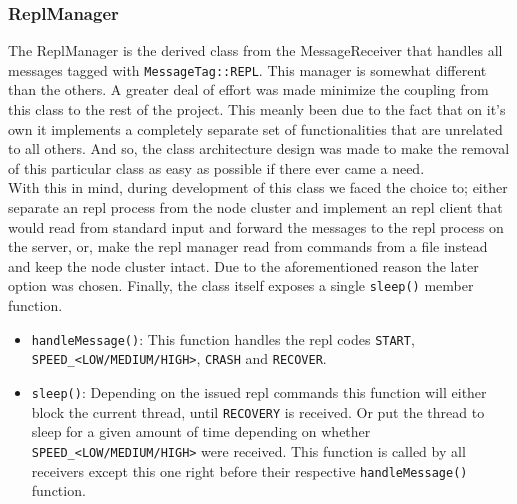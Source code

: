 \documentclass[11pt]{article}
\begin{document}
\subsubsection{ReplManager}
The ReplManager is the derived class from the MessageReceiver that handles all
messages tagged with \texttt{MessageTag::REPL}. This manager is somewhat
different than the others. A greater deal of effort was made minimize the
coupling from this class to the rest of the project. This meanly been due to the
fact that on it's own it implements a completely separate set of functionalities
that are unrelated to all others. And so, the class architecture design was made
to make the removal of this particular class as easy as possible if there ever
came a need.\\ With this in mind, during development of this class we faced the
choice to; either separate an repl process from the node cluster and implement
an repl client that would read from standard input and forward the messages to
the repl process on the server, or, make the repl manager read from commands
from a file instead and keep the node cluster intact. Due to the aforementioned
reason the later option was chosen. Finally, the class itself exposes a single
\texttt{sleep()} member function.\\
\begin{itemize}
\item \texttt{handleMessage()}: This function handles the repl codes
  \texttt{START}, \texttt{SPEED\_<LOW/MEDIUM/HIGH>}, \texttt{CRASH} and
  \texttt{RECOVER}.\\
\item \texttt{sleep()}: Depending on the issued repl commands this function will
  either block the current thread, until \texttt{RECOVERY} is received. Or put
  the thread to sleep for a given amount of time depending on whether
  \texttt{SPEED\_<LOW/MEDIUM/HIGH>} were received. This function is called by
  all receivers except this one right before their respective
  \texttt{handleMessage()} function.
\end{itemize}
\end{document}
